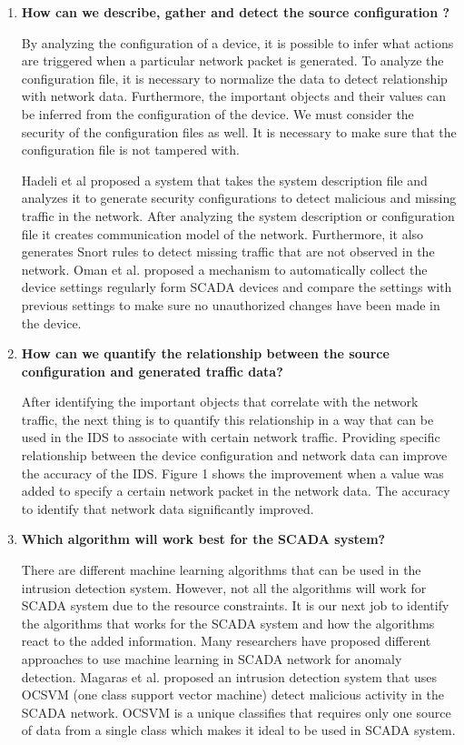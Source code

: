 \documentclass[letterpaper, 10 pt, conference]{ieeeconf}  %
\begin{document}
\begin{enumerate}
    \item \textbf{How can we describe, gather and detect the source configuration ?}\par
    By analyzing the configuration of a device, it is possible to infer what actions are triggered when a particular network packet is generated. To analyze the configuration file, it is necessary to normalize the data to detect relationship with network data. Furthermore, the important objects and their values can be inferred from the configuration of the device. We must consider the security of the configuration files as well. It is necessary to make sure that the configuration file is not tampered with.\par
    Hadeli et al \cite{c21} proposed a system that takes the system description file and analyzes it to generate security configurations to detect malicious and missing traffic in the network. After analyzing the system description or configuration file it creates communication model of the network. Furthermore, it also generates Snort rules to detect missing traffic that are not observed in the network.
    Oman et al. \cite{c22} proposed a mechanism to automatically collect the device settings regularly form SCADA devices and compare the settings with previous settings to make sure no unauthorized changes have been made in the device.

    \item \textbf{ How can we quantify the relationship between the source configuration and generated traffic data?}\par
    After identifying the important objects that correlate with the network traffic, the next thing is to quantify this relationship in a way that can be used in the IDS to associate with certain network traffic. Providing specific relationship between the device configuration and network data can improve the accuracy of the IDS. Figure 1 shows the improvement when a value was added to specify a certain network packet in the network data. The accuracy to identify that network data significantly improved.
    \item \textbf{ Which algorithm will work best for the SCADA system?}\par
    There are different machine learning algorithms that can be used in the intrusion detection system. However, not all the algorithms will work for SCADA system due to the resource constraints. It is our next job to identify the algorithms that works for the SCADA system and how the algorithms react to the added information. Many researchers have proposed different approaches to use machine learning in SCADA network for anomaly detection. Magaras et al. proposed an intrusion detection system that uses OCSVM (one class support vector machine) detect malicious activity in the SCADA network. OCSVM is a unique classifies that requires only one source of data from a single class which makes it ideal to be used in SCADA system.

\end{enumerate}
\end{document}
